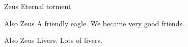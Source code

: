{%
	Zeus}
{%
	Eternal torment}
{}

{%
	Also Zeus}
{%
	A friendly eagle. We became very good friends.}
{}

{%
	Also Zeus}
{%
	Livers. Lots of livers.}
{}
